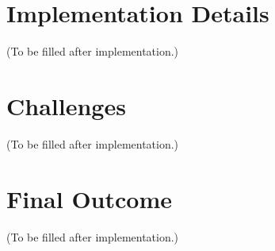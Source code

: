 \documentclass[a4paper,12pt]{report}
\begin{document}
\section{Implementation Details}
(To be filled after implementation.)

\section{Challenges}
(To be filled after implementation.)

\section{Final Outcome}
(To be filled after implementation.)
\end{document}
